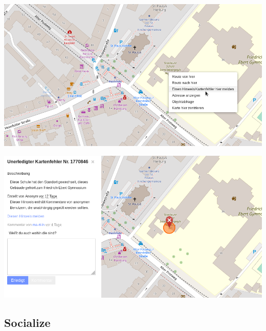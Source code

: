 \documentclass{beamer}
\begin{document}
	\begin{frame}
		\begin{center}
			\includegraphics[width=\linewidth,height=\textheight,keepaspectratio]{images/report-error-2-menu}
		\end{center}
	\end{frame}
	
	\begin{frame}
		\begin{center}
			\includegraphics[width=\linewidth,height=\textheight,keepaspectratio]{images/report-error-2}
		\end{center}
	\end{frame}
	
	\subsection{Socialize}
	
\end{document}
